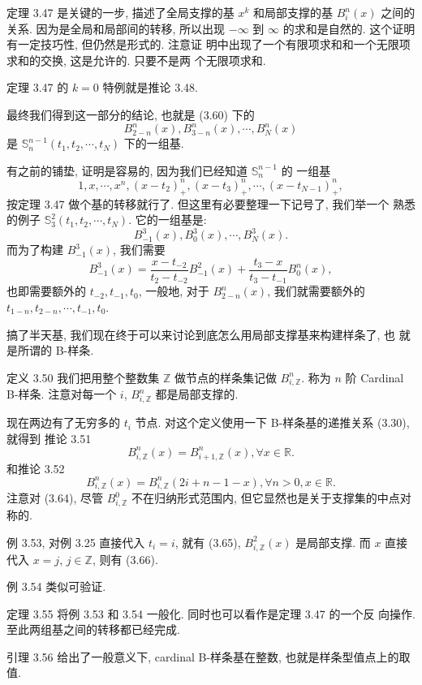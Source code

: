\documentclass[a4paper]{ctexart}
\begin{document}
{定理 3.47 是关键的一步, 描述了全局支撑的基 $x^k$ 和局部支撑的基
$B_i^n(x)$ 之间的关系. 因为是全局和局部间的转移, 所以出现 $-\infty$ 到
$\infty$ 的求和是自然的. 这个证明有一定技巧性, 但仍然是形式的. 注意证
明中出现了一个有限项求和和一个无限项求和的交换, 这是允许的. 只要不是两
个无限项求和.

定理 3.47 的 $k = 0$ 特例就是推论 3.48.

最终我们得到这一部分的结论, 也就是 (3.60) 下的
$$
B_{2 - n}^n(x), B_{3 - n}^n(x), \cdots, B_{N}^n(x)
$$
是 $\mathbb{S}_n^{n - 1}(t_1, t_2, \cdots, t_N)$ 下的一组基.

有之前的铺垫, 证明是容易的, 因为我们已经知道 $\mathbb{S}_n^{n - 1}$ 的
一组基
$$
1, x, \cdots, x^n, (x - t_2)_+^n, (x - t_3)_+^n, \cdots, (x - t_{N - 1})_+^n,
$$
按定理 3.47 做个基的转移就行了. 但这里有必要整理一下记号了, 我们举一个
熟悉的例子 $\mathbb{S}_3^2(t_1, t_2, \cdots, t_N)$. 它的一组基是:
$$
B_{-1}^3(x), B_{0}^3(x), \cdots, B_N^3(x).
$$
而为了构建 $B_{-1}^3(x)$, 我们需要
$$
B_{-1}^3(x) = \frac{x - t_{-2}}{t_2 - t_{-2}}B_{-1}^2(x) +
\frac{t_{3} - x}{t_3 - t_{-1}}B_{0}^n(x),
$$
也即需要额外的 $t_{-2}, t_{-1}, t_0$, 一般地, 对于 $B_{2 - n}^n(x)$,
我们就需要额外的$t_{1 - n}, t_{2 - n}, \cdots, t_{-1}, t_0$.

搞了半天基, 我们现在终于可以来讨论到底怎么用局部支撑基来构建样条了, 也
就是所谓的 B-样条.

定义 3.50 我们把用整个整数集 $\mathbb{Z}$ 做节点的样条集记做 $B_{i,
  \mathbb{Z}}^n$. 称为 $n$ 阶 Cardinal B-样条. 注意对每一个 $i$, $B_{i,
  \mathbb{Z}}^n$ 都是局部支撑的.

现在两边有了无穷多的 $t_i$ 节点. 对这个定义使用一下 B-样条基的递推关系 (3.30), 就得到
推论 3.51
$$
B_{i, \mathbb{Z}}^n(x) = B_{i + 1, \mathbb{Z}}^n(x), \forall x \in \mathbb{R}.
$$
和推论 3.52
$$
B_{i, \mathbb{Z}}^n(x) = B_{i, \mathbb{Z}}^n(2i + n - 1 - x), \forall n > 0, x \in \mathbb{R}.
$$
注意对 (3.64), 尽管 $B_{i, \mathbb{Z}}^0$ 不在归纳形式范围内, 但它显然也是关于支撑集的中点对称的.

例 3.53, 对例 3.25 直接代入 $t_i = i$, 就有 (3.65), $B_{i,
  \mathbb{Z}}^2(x)$ 是局部支撑. 而 $x$ 直接代入 $x = j$, $j \in
\mathbb{Z}$, 则有 (3.66).

例 3.54 类似可验证.

定理 3.55 将例 3.53 和 3.54 一般化. 同时也可以看作是定理 3.47 的一个反
向操作. 至此两组基之间的转移都已经完成.

引理 3.56 给出了一般意义下, cardinal B-样条基在整数, 也就是样条型值点上的取值.

}
\end{document}
